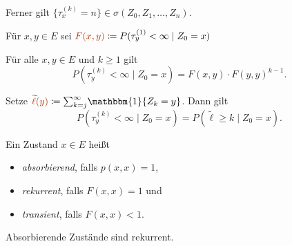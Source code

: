 \documentclass{cheat-sheet}
\newcommand{\ind}{\mathbbm{1}} %
\newcommand{\Defn}[1]{\textcolor{DefinitionColor}{#1}}
\begin{document}
\begin{bem}
  Ferner gilt $\{ \tau_x^{(k)} = n \} \in \sigma(Z_0, Z_1, \ldots, Z_n)$.
\end{bem}

\begin{defn}
  Für $x, y \in E$ sei
  $\Defn{F(x, y)} \coloneqq P(\tau_y^{(1)} < \infty \mid Z_0 = x)$
\end{defn}

\begin{lem}
  Für alle $x, y \in E$ und $k \geq 1$ gilt
  \[ P(\tau_y^{(k)} < \infty \mid Z_0 = x) = F(x, y) \cdot F(y, y)^{k-1}. \]
\end{lem}

\begin{bem}
  Setze $\Defn{\widetilde{\ell}(y)} \coloneqq {\sum}_{k=j}^\infty \ind \{ Z_k = y \}$.
  Dann gilt
  \[ P(\tau_y^{(k)} < \infty \mid Z_0 = x) = P(\widetilde{\ell} \geq k \mid Z_0 = x). \]
\end{bem}

\begin{defn}
  Ein Zustand $x \in E$ heißt
  \begin{itemize}
    \item \emph{absorbierend}, falls $p(x, x) = 1$,
    \item \emph{rekurrent}, falls $F(x, x) = 1$ und
    \item \emph{transient}, falls $F(x, x) < 1$.
  \end{itemize}
\end{defn}

\begin{bem}
  Absorbierende Zustände sind rekurrent.
\end{bem}


\end{document}
